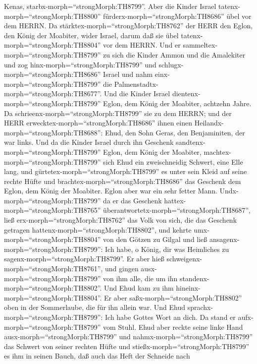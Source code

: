 Kenas, starbx-morph=``strongMorph:TH8799''.  Aber die
Kinder Israel tatenx-morph=``strongMorph:TH8800''
fürderx-morph=``strongMorph:TH8686'' übel vor dem HERRN. Da
stärktex-morph=``strongMorph:TH8762'' der HERR den Eglon, den König der
Moabiter, wider Israel, darum daß sie übel
tatenx-morph=``strongMorph:TH8804'' vor dem HERRN.  Und er
sammeltex-morph=``strongMorph:TH8799'' zu sich die Kinder Ammon und die
Amalekiter und zog hinx-morph=``strongMorph:TH8799'' und
schlugx-morph=``strongMorph:TH8686'' Israel und nahm
einx-morph=``strongMorph:TH8799'' die
Palmenstadtx-morph=``strongMorph:TH8677''.  Und die Kinder
Israel dientenx-morph=``strongMorph:TH8799'' Eglon, dem König der
Moabiter, achtzehn Jahre.  Da
schrieenx-morph=``strongMorph:TH8799'' sie zu dem HERRN; und der HERR
erwecktex-morph=``strongMorph:TH8686'' ihnen einen
Heilandx-morph=``strongMorph:TH8688'': Ehud, den Sohn Geras, den
Benjaminiten, der war links. Und da die Kinder Israel durch ihn Geschenk
sandtenx-morph=``strongMorph:TH8799'' Eglon, dem König der Moabiter,
 machtex-morph=``strongMorph:TH8799'' sich Ehud ein
zweischneidig Schwert, eine Elle lang, und
gürtetex-morph=``strongMorph:TH8799'' es unter sein Kleid auf seine
rechte Hüfte  und brachtex-morph=``strongMorph:TH8686'' das
Geschenk dem Eglon, dem König der Moabiter. Eglon aber war ein sehr
fetter Mann.  Undx-morph=``strongMorph:TH8799'' da er das
Geschenk hattex-morph=``strongMorph:TH8765''
überantwortetx-morph=``strongMorph:TH8687'', ließ
erx-morph=``strongMorph:TH8762'' das Volk von sich, die das Geschenk
getragen hattenx-morph=``strongMorph:TH8802'',  und kehrte
umx-morph=``strongMorph:TH8804'' von den Götzen zu Gilgal und ließ
ansagenx-morph=``strongMorph:TH8799'': Ich habe, o König, dir was
Heimliches zu sagenx-morph=``strongMorph:TH8799''. Er aber hieß
schweigenx-morph=``strongMorph:TH8761'', und gingen
ausx-morph=``strongMorph:TH8799'' von ihm alle, die um ihn
standenx-morph=``strongMorph:TH8802''.  Und Ehud kam zu ihm
hineinx-morph=``strongMorph:TH8804''. Er aber
saßx-morph=``strongMorph:TH8802'' oben in der Sommerlaube, die für ihn
allein war. Und Ehud sprachx-morph=``strongMorph:TH8799'': Ich habe
Gottes Wort an dich. Da stand er aufx-morph=``strongMorph:TH8799'' vom
Stuhl.  Ehud aber reckte seine linke Hand
ausx-morph=``strongMorph:TH8799'' und nahmx-morph=``strongMorph:TH8799''
das Schwert von seiner rechten Hüfte und
stießx-morph=``strongMorph:TH8799'' es ihm in seinen Bauch,
 daß auch das Heft der Schneide nach
